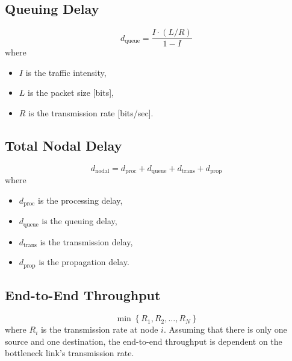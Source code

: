\subsection{Queuing Delay}
\begin{equation*}
    d_\text{queue} = \frac{I\cdot (L/R)}{1 - I}
\end{equation*}
where
\begin{itemize}
    \item $I$ is the traffic intensity,
    \item $L$ is the packet size [bits],
    \item $R$ is the transmission rate [bits/sec].
\end{itemize}

\subsection{Total Nodal Delay}
\begin{equation*}
    d_\text{nodal} = d_\text{proc} + d_\text{queue} + d_\text{trans} + d_\text{prop}
\end{equation*}
where
\begin{itemize}
    \item $d_\text{proc}$ is the processing delay,
    \item $d_\text{queue}$ is the queuing delay,
    \item $d_\text{trans}$ is the transmission delay,
    \item $d_\text{prop}$ is the propagation delay.
\end{itemize}

\subsection{End-to-End Throughput}
\begin{equation*}
    \min\left\{R_1, R_2, \ldots, R_N\right\}
\end{equation*}
where $R_i$ is the transmission rate at node $i$. Assuming that there is only one source and one destination, the end-to-end throughput is dependent on the bottleneck link's transmission rate.